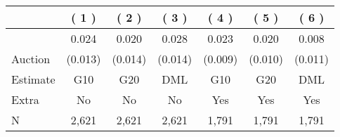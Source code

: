 
\begin{tabular}{lcccccc}
\toprule
 & ( 1 ) & ( 2 ) & ( 3 ) & ( 4 ) & ( 5 ) & ( 6 )\\
\midrule
 & 0.024 & 0.020 & 0.028 & 0.023 & 0.020 & 0.008\\

\multirow{-2}{*}{\raggedright\arraybackslash Auction} & (0.013) & (0.014) & (0.014) & (0.009) & (0.010) & (0.011)\\

\midrule
Estimate & G10 & G20 & DML & G10 & G20 & DML\\

Extra & No & No & No & Yes & Yes & Yes\\
\midrule

N & 2,621 & 2,621 & 2,621 & 1,791 & 1,791 & 1,791\\
\bottomrule
\end{tabular}
